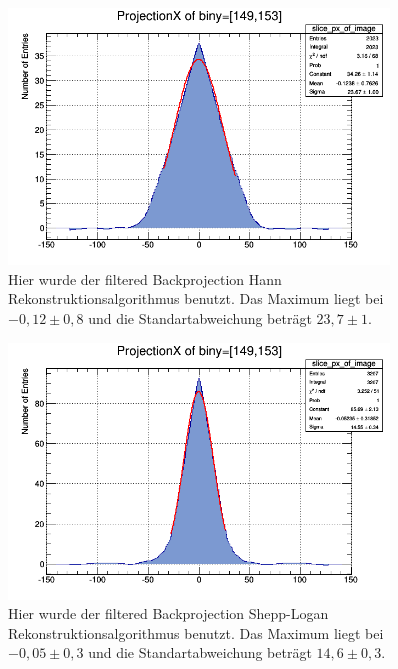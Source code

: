 \begin{figure}[h!]
	\centering
	\includegraphics[width=0.9\textwidth]{Hann-Filter.png}
	\caption{Hier wurde der filtered Backprojection Hann Rekonstruktionsalgorithmus benutzt. Das Maximum liegt bei $-0,12 \pm 0,8$ und die Standartabweichung beträgt $23,7 \pm 1$.}
	\label{ooh}
\end{figure}
\begin{figure}[h!]
	\centering
	\includegraphics[width=0.9\textwidth]{Shepp-Logan-Filter.png}
	\caption{Hier wurde der filtered Backprojection Shepp-Logan  Rekonstruktionsalgorithmus benutzt. Das Maximum liegt bei $-0,05 \pm 0,3$ und die Standartabweichung beträgt $14,6 \pm 0,3$.}
	\label{oos}
\end{figure}
